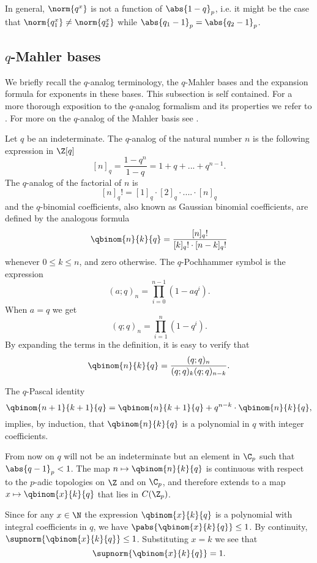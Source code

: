     \begin{remark}
    In general, $\norm{q^x}$ is not a function of $\abs{1-q}_p$, i.e. it might be the case that $\norm{q_1^x}\neq\norm{q_2^x}$ while $\abs{q_1-1}_p=\abs{q_2-1}_p$.
    \end{remark} 

\subsection{$q$-Mahler bases}
We briefly recall the $q$-analog terminology, the $q$-Mahler bases and the expansion formula for exponents in these bases.
This subsection is self contained.
For a more thorough exposition to the $q$-analog formalism and its properties we refer to \cite{q_calculus,special_functions}.
For more on the $q$-analog of the Mahler basis see \cite{conrad2000q}.

Let $q$ be an indeterminate.
The $q$-analog of the natural number $n$ is the following expression in $\Z[q]$
\[[n]_q=\frac{1-q^n}{1-q}=1+q+...+q^{n-1}.\]
The $q$-analog of the factorial of $n$ is 
\[[n]_q!=[1]_q\cdot [2]_q\cdot ....\cdot [n]_q\]
and the $q$-binomial coefficients, also known as Gaussian binomial coefficients, are defined by the analogous formula
\[\qbinom{n}{k}{q}=\frac{[n]_q!}{[k]_q!\cdot [n-k]_q!}\]
whenever $0\leq k\leq n$, and zero otherwise.
The $q$-Pochhammer symbol is the expression
\[(a;q)_n=\prod_{i=0}^{n-1}(1-aq^i).\]
When $a=q$ we get
\[(q;q)_n=\prod_{i=1}^{n}(1-q^i).\]
By expanding the terms in the definition, it is easy to verify that
\[\qbinom{n}{k}{q}=\frac{(q;q)_n}{(q;q)_{k}(q;q)_{n-k}}.\]

The $q$-Pascal identity
\begin{equation}\label{q_Pascal}
\qbinom{n+1}{k+1}{q}=\qbinom{n}{k+1}{q}+q^{n-k}\cdot\qbinom{n}{k}{q},
\end{equation}
implies, by induction, that $\qbinom{n}{k}{q}$ is a polynomial in $q$ with integer coefficients.

From now on $q$ will not be an indeterminate but an element in $\C_p$ such that $\abs{q-1}_p<1$.
The map $n\mapsto \qbinom{n}{k}{q}$ is continuous with respect to the $p$-adic topologies on $\Z$ and on $\C_p$, and therefore extends to a map $x\mapsto \qbinom{x}{k}{q}$ that lies in $C(\Z_p)$.

Since for any $x\in \N$ the expression $\qbinom{x}{k}{q}$ is a polynomial with integral coefficients in $q$, we have $\pabs{\qbinom{x}{k}{q}}\leq 1$.
By continuity, $\supnorm{\qbinom{x}{k}{q}}\leq 1$.
Substituting $x=k$ we see that 
\[\supnorm{\qbinom{x}{k}{q}}=1.\]

